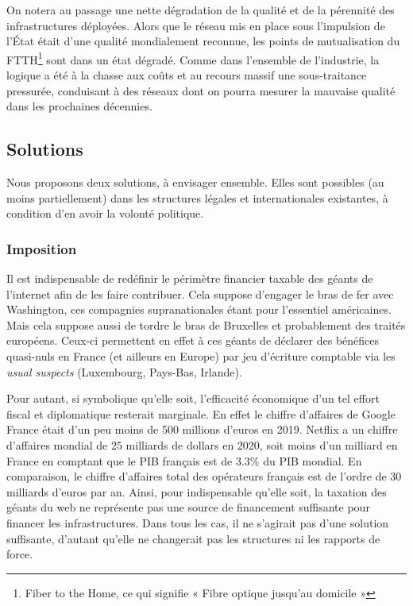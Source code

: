 \documentclass[a4paper]{article}
\begin{document}
On notera au passage une nette dégradation de la qualité et de la pérennité des infrastructures déployées. Alors que le réseau mis en place sous l’impulsion de l’État était d’une qualité mondialement reconnue, les points de mutualisation du FTTH\footnote{Fiber to the Home, ce qui signifie « Fibre optique jusqu'au domicile »} sont dans un état dégradé. Comme dans l’ensemble de l’industrie, la logique a été à la chasse aux coûts et au recours massif une sous-traitance pressurée, conduisant à des réseaux dont on pourra mesurer la mauvaise qualité dans les prochaines décennies.

\subsection{Solutions}
Nous proposons deux solutions, à envisager ensemble. Elles sont possibles (au moins partiellement) dans les structures légales et internationales existantes, à condition d’en avoir la volonté politique.
\subsubsection{Imposition}
Il est indispensable de redéfinir le périmètre financier taxable des géants de l’internet afin de les faire contribuer. Cela suppose d’engager le bras de fer avec Washington, ces compagnies supranationales étant pour l’essentiel américaines. Mais cela suppose aussi de tordre le bras de Bruxelles et probablement des traités européens. Ceux-ci permettent en effet à ces géants de déclarer des bénéfices quasi-nuls en France (et ailleurs en Europe) par jeu d’écriture comptable via les \textit{usual suspects} (Luxembourg, Pays-Bas, Irlande).
 
Pour autant, si symbolique qu’elle soit, l’efficacité économique d’un tel effort fiscal et diplomatique resterait marginale. En effet le chiffre d'affaires de Google France était d’un peu moins de 500 millions d’euros en 2019. Netflix a un chiffre d'affaires mondial de 25 milliards de dollars en 2020, soit moins d’un milliard en France en comptant que le PIB français est de 3.3\% du PIB mondial. En comparaison, le chiffre d'affaires total des opérateurs français est de l’ordre de 30 milliards d’euros par an. Ainsi, pour indispensable qu’elle soit, la taxation des géants du web ne représente pas une source de financement suffisante pour financer les infrastructures. Dans tous les cas, il ne s’agirait pas d’une solution suffisante, d'autant qu'elle ne changerait pas les structures ni les rapports de force.
\end{document}
